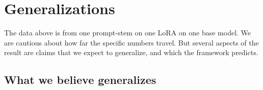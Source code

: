 \documentclass[11pt,a4paper]{article}
\begin{document}
\section{Generalizations}
\label{sec:generalize}

The data above is from one prompt-stem on one LoRA on one base model. We are cautious about how far the specific numbers travel. But several aspects of the result are claims that we expect to generalize, and which the framework predicts.

\subsection{What we believe generalizes}
\end{document}
